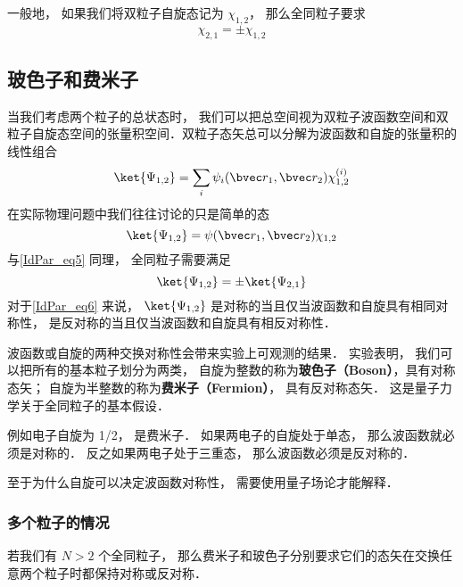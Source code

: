 一般地， 如果我们将双粒子自旋态记为 $\chi_{1,2}$， 那么全同粒子要求
\begin{equation}
\chi_{2,1} = \pm\chi_{1,2}
\end{equation}

\subsection{玻色子和费米子}
当我们考虑两个粒子的总状态时， 我们可以把总空间视为双粒子波函数空间和双粒子自旋态空间的张量积空间．双粒子态矢总可以分解为波函数和自旋的张量积的线性组合 %
\begin{equation}
\ket{\Psi_{1,2}} = \sum_i \psi_i(\bvec r_1, \bvec r_2) \chi^{(i)}_{1,2}
\end{equation}
在实际物理问题中我们往往讨论的只是简单的态
\begin{equation}\label{IdPar_eq6}
\ket{\Psi_{1,2}} = \psi(\bvec r_1, \bvec r_2) \chi_{1,2}
\end{equation}
与\autoref{IdPar_eq5} 同理， 全同粒子需要满足
\begin{equation}
\ket{\Psi_{1,2}} = \pm \ket{\Psi_{2,1}}
\end{equation}
对于\autoref{IdPar_eq6} 来说， $\ket{\Psi_{1,2}}$ 是对称的当且仅当波函数和自旋具有相同对称性， 是反对称的当且仅当波函数和自旋具有相反对称性． 

波函数或自旋的两种交换对称性会带来实验上可观测的结果． 实验表明， 我们可以把所有的基本粒子划分为两类， 自旋为整数的称为\textbf{玻色子（Boson）}，具有对称态矢； 自旋为半整数的称为\textbf{费米子（Fermion）}， 具有反对称态矢． 这是量子力学关于全同粒子的基本假设．

例如电子自旋为 1/2， 是费米子． 如果两电子的自旋处于单态， 那么波函数就必须是对称的． 反之如果两电子处于三重态， 那么波函数必须是反对称的．

至于为什么自旋可以决定波函数对称性， 需要使用量子场论才能解释． %

\subsubsection{多个粒子的情况}
若我们有 $N > 2$ 个全同粒子， 那么费米子和玻色子分别要求它们的态矢在交换任意两个粒子时都保持对称或反对称．
